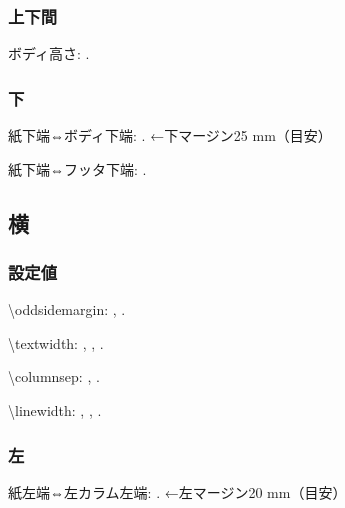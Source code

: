 \documentclass{FITpaper}
\begin{document}
\subsubsection{上下間}

ボディ高さ:
\prntlen{\textheight}.

\subsubsection{下}

\newlength{\mybottom}
\setlength\mybottom{\paperheight}

\addtolength{\mybottom}{-\mytop}
\addtolength{\mybottom}{-\textheight}

紙下端⇔ボディ下端:
\prntlen{\mybottom}.
←下マージン25 mm（目安）

\addtolength\mybottom{-\footskip}

紙下端⇔フッタ下端:
\prntlen{\mybottom}.

\subsection{横}

\subsubsection{設定値}

\textbackslash oddsidemargin:
\prntlen{\oddsidemargin},
\prntlen{\oddsidemargin}.

\textbackslash textwidth:
\prntlen{\textwidth},
\prntlen{\textwidth},
\prntlen{\textwidth}.

\textbackslash columnsep:
\prntlen{\columnsep},
\prntlen{\columnsep}.

\textbackslash linewidth:
\prntlen{\linewidth},
\prntlen{\linewidth},
\prntlen{\linewidth}.

\subsubsection{左}

\newlength{\myleft}
\setlength{\myleft}{\oddsidemargin}

\addtolength\myleft{1in}

紙左端⇔左カラム左端:
\prntlen{\myleft}.
←左マージン20 mm（目安）
\end{document}
